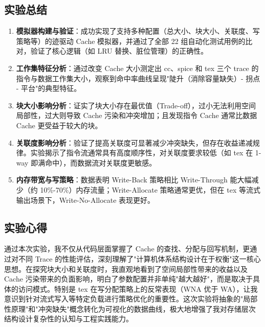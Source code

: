 \documentclass[12pt,a4paper]{article}
\begin{document}
\subsection{实验总结}

\begin{enumerate}
    \item \textbf{模拟器构建与验证}：成功实现了支持多种配置（总大小、块大小、关联度、写策略等）的迹驱动 Cache 模拟器，并通过了全部 22 组自动化测试用例的比对，验证了核心逻辑（如 LRU 替换、脏位管理）的正确性。
    
    \item \textbf{工作集特征分析}：通过改变 Cache 大小测定出 cc、spice 和 tex 三个 trace 的指令与数据工作集大小，观察到命中率曲线呈现"陡升（消除容量缺失）- 拐点 - 平台"的典型特征。
    
    \item \textbf{块大小影响分析}：证实了块大小存在最优值（Trade-off），过小无法利用空间局部性，过大则导致 Cache 污染和冲突增加；且发现指令 Cache 通常比数据 Cache 更受益于较大的块。
    
    \item \textbf{关联度影响分析}：验证了提高关联度可显著减少冲突缺失，但存在收益递减规律。实验揭示了指令流通常具有高度顺序性，对关联度要求较低（如 tex 在 1-way 即满命中），而数据流对关联度更敏感。
    
    \item \textbf{内存带宽与写策略}：数据表明 Write-Back 策略相比 Write-Through 能大幅减少（约 10\%-70\%）内存流量；Write-Allocate 策略通常更优，但在 tex 等流式输出场景下，Write-No-Allocate 表现更好。
\end{enumerate}

\subsection{实验心得}

通过本次实验，我不仅从代码层面掌握了 Cache 的查找、分配与回写机制，更通过对不同 Trace 的性能评估，深刻理解了"计算机体系结构设计在于权衡"这一核心思想。在探究块大小和关联度时，我直观地看到了空间局部性带来的收益以及 Cache 污染带来的负面影响，明白了参数配置并非单纯"越大越好"，而是取决于具体的访问模式。特别是 tex 在写分配策略上的反常表现（WNA 优于 WA），让我意识到针对流式写入等特定负载进行策略优化的重要性。这次实验将抽象的"局部性原理"和"冲突缺失"概念转化为可视化的数据曲线，极大地增强了我对存储层次结构设计复杂性的认知与工程实践能力。
\end{document}
